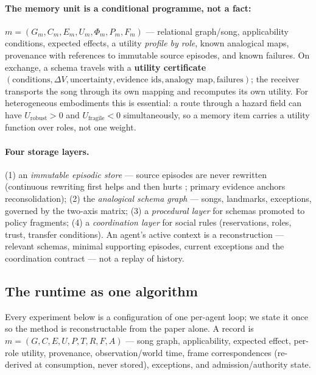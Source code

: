 \documentclass{article}
\begin{document}
\paragraph{The memory unit is a conditional programme, not a fact:}
$m = (G_m, C_m, E_m, U_m, \Phi_m, P_m, F_m)$ --- relational
graph/song, applicability conditions, expected effects, a utility
\emph{profile by role}, known analogical maps, provenance with
references to immutable source episodes, and known failures. On
exchange, a schema travels with a \textbf{utility certificate}
$(\text{conditions}, \Delta V, \text{uncertainty},
\text{evidence ids}, \text{analogy map}, \text{failures})$; the
receiver transports the song through its own mapping and recomputes
its own utility. For heterogeneous embodiments this is essential: a
route through a hazard field can have $U_{\mathrm{robust}} > 0$ and
$U_{\mathrm{fragile}} < 0$ simultaneously, so a memory item carries a
utility function over roles, not one weight.

\paragraph{Four storage layers.} (1) an \emph{immutable episodic
store} --- source episodes are never rewritten (continuous rewriting
first helps and then hurts \citep{faulty2026}; primary evidence
anchors reconsolidation); (2) the \emph{analogical schema graph} ---
songs, landmarks, exceptions, governed by the two-axis matrix; (3) a
\emph{procedural layer} for schemas promoted to policy fragments;
(4) a \emph{coordination layer} for social rules (reservations,
roles, trust, transfer conditions). An agent's active context is a
reconstruction --- relevant schemas, minimal supporting episodes,
current exceptions and the coordination contract --- not a replay of
history.

\subsection{The runtime as one algorithm}
\label{sec:algorithm}

Every experiment below is a configuration of one per-agent loop; we
state it once so the method is reconstructable from the paper alone.
A record is $m=(G,C,E,U,P,T,R,F,A)$ --- song graph, applicability,
expected effect, per-role utility, provenance, observation/world
time, frame correspondences (re-derived at consumption, never
stored), exceptions, and admission/authority state.
\end{document}
